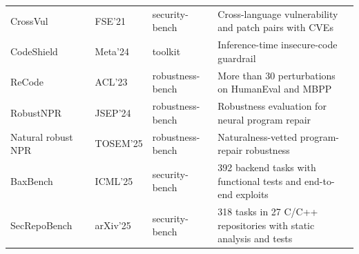 \documentclass[acmsmall,screen,review]{acmart}
\begin{document}
{\begin{longtable}{@{}L{2.65cm} L{1.75cm} L{2.40cm} L{4.85cm}@{}}
CrossVul~\cite{crossvul2021} & FSE'21 & security-bench & Cross-language vulnerability and patch pairs with CVEs \\
CodeShield~\cite{codeshield2024} & Meta'24 & toolkit & Inference-time insecure-code guardrail \\
ReCode~\cite{wang2023recode} & ACL'23 & robustness-bench & More than 30 perturbations on HumanEval and MBPP \\
RobustNPR~\cite{robustnpr2024} & JSEP'24 & robustness-bench & Robustness evaluation for neural program repair \\
Natural robust NPR~\cite{naturalnpr2025} & TOSEM'25 & robustness-bench & Naturalness-vetted program-repair robustness \\
BaxBench~\cite{baxbench2025} & ICML'25 & security-bench & 392 backend tasks with functional tests and end-to-end exploits \\
SecRepoBench~\cite{secrepobench2025} & arXiv'25 & security-bench & 318 tasks in 27 C/C++ repositories with static analysis and tests \\
\end{longtable}
}
\end{document}
